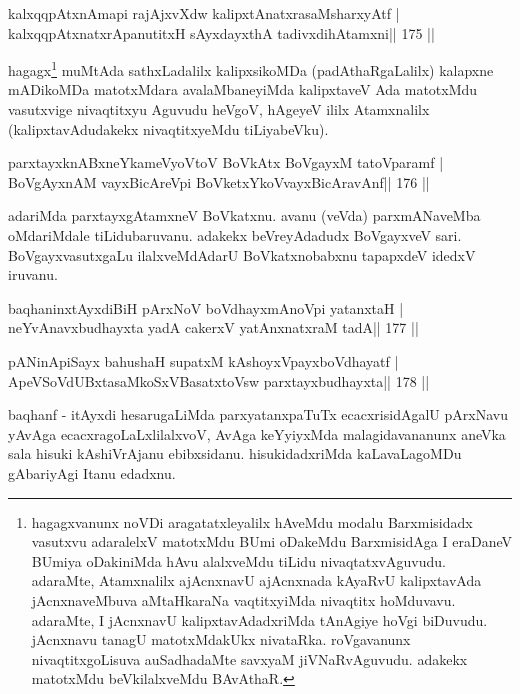 
\begin{shl}
kalxqqpAtxnAmapi rajAjxvXdw kalipxtAnatxrasaMsharxyAtf |
kalxqqpAtxnatxrApanutitxH sAyxdayxthA tadivxdihA\s\s tamxni\hfill || 175 ||
\end{shl}

\begin{artha}
hagagx\footnote[12]{hagagxvanunx noVDi aragatatxleyalilx hAveMdu modalu 
Barxmisidadx vasutxvu adaralelxV matotxMdu BUmi oDakeMdu BarxmisidAga I 
eraDaneV BUmiya oDakiniMda hAvu alalxveMdu tiLidu nivaqtatxvAguvudu. 
adaraMte, Atamxnalilx ajAcnxnavU ajAcnxnada kAyaRvU kalipxtavAda 
jAcnxnaveMbuva aMtaHkaraNa vaqtitxyiMda nivaqtitx hoMduvavu. adaraMte, 
I jAcnxnavU kalipxtavAdadxriMda tAnAgiye hoVgi biDuvudu. jAcnxnavu tanagU matotxMdakUkx nivataRka. roVgavanunx nivaqtitxgoLisuva auSadhadaMte savxyaM jiVNaRvAguvudu. adakekx matotxMdu beVkilalxveMdu BAvAthaR.} muMtAda sathxLadalilx kalipxsikoMDa (padAthaRgaLalilx) kalapxne mADikoMDa matotxMdara avalaMbaneyiMda kalipxtaveV Ada matotxMdu vasutxvige nivaqtitxyu Aguvudu heVgoV, hAgeyeV ililx Atamxnalilx (kalipxtavAdudakekx nivaqtitxyeMdu tiLiya\-beVku).
\end{artha}

\begin{shl}
parxtayxknABxneYkameVyoV\s toV BoVkAtx BoVgayxM tatoV\s paramf |
BoVgAyxnAM vayxBicAreV\s pi BoVketxYkoV\s vayxBicAravAnf\hfill || 176 ||
\end{shl}

\begin{artha}
adariMda parxtayxgAtamxneV BoVkatxnu. avanu (veVda) parxmANaveMba  oMdariMdale tiLidubaruvanu. adakekx beVreyAdadudx BoVgayxveV sari. BoVgayxvasutxgaLu ilalxveMdAdarU BoVkatxnobabxnu tapapxdeV idedxV iruvanu.
\end{artha}

\begin{shl}
baqhaninxtAyxdiBiH pArxNoV boVdhayxmAnoV\s pi yatanxtaH |
neYvAnavxbudhayxta yadA cakerxV yatAnxnatxraM tadA\hfill || 177 ||
\end{shl}

\begin{shl}
pANinA\s\s piSayx bahushaH supatxM kAshoyxV\s payxboVdhayatf |
ApeVSoVdUBxtasaMkoSxVBasatxtoV\s sw parxtayxbudhayxta\hfill || 178 ||
\end{shl}

\begin{artha}
baqhanf - itAyxdi hesarugaLiMda parxyatanxpaTuTx ecacxrisidAgalU  pArxNavu yAvAga ecacxragoLaLxlilalxvoV, AvAga keYyiyxMda  malagidavananunx aneVka sala hisuki kAshiVrAjanu ebibxsidanu.  hisukidadxriMda kaLavaLagoMDu gAbariyAgi Itanu edadxnu.
\end{artha}

